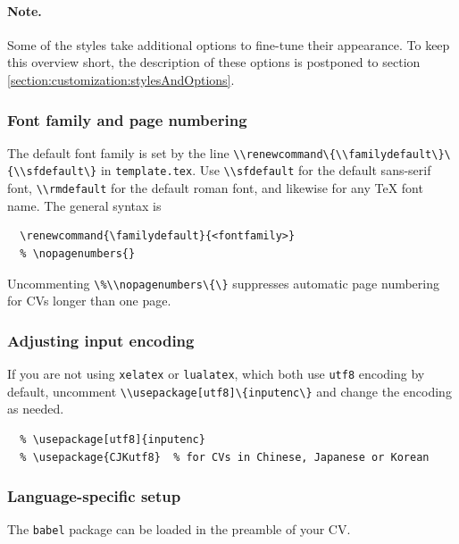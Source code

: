 \documentclass[a4paper, 11pt]{article}
\newcommand{\code}[1]{\lstinline!#1!}
\newcommand{\cvtemplate}{\code{template.tex}}
\begin{document}
\paragraph{Note.} Some of the styles take additional options to fine-tune their appearance.
To keep this overview short, the description of these options is postponed to section \ref{section:customization:stylesAndOptions}.

\subsubsection*{Font family and page numbering}
The default font family is set by the line \code{\\renewcommand\{\\familydefault\}\{\\sfdefault\}} in \cvtemplate.
Use \code{\\sfdefault} for the default sans-serif font, \code{\\rmdefault} for the default roman font, and likewise for any \TeX{} font name.
The general syntax is
\begin{lstlisting}
  \renewcommand{\familydefault}{<fontfamily>}
  % \nopagenumbers{}
\end{lstlisting}
Uncommenting \code{\%\\nopagenumbers\{\}} suppresses automatic page numbering for CVs longer than one page.

\subsubsection*{Adjusting input encoding}
If you are not using \code{xelatex} or \code{lualatex}, which both use \code{utf8} encoding by default, uncomment \code{\\usepackage[utf8]\{inputenc\}} and change the encoding as needed.
\begin{lstlisting}
  % \usepackage[utf8]{inputenc}
  % \usepackage{CJKutf8}  % for CVs in Chinese, Japanese or Korean
\end{lstlisting}

\subsubsection{Language-specific setup}
The \code{babel} package can be loaded in the preamble of your CV.
\end{document}
